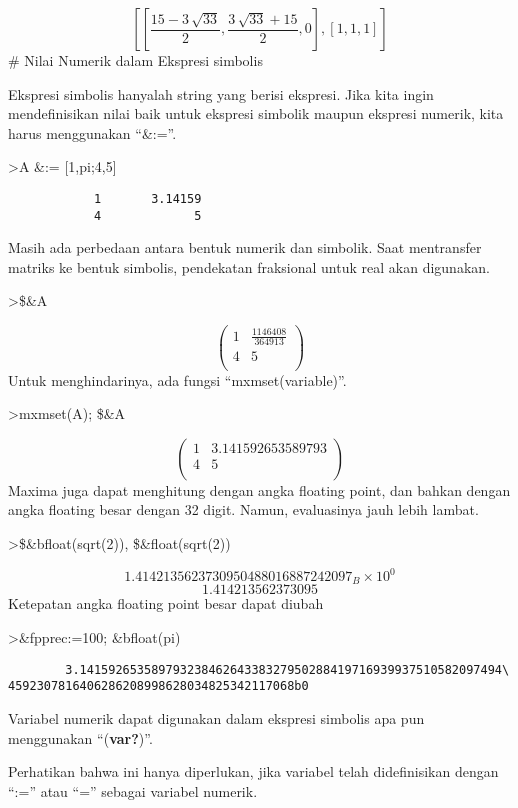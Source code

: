 \documentclass[
]{book}
\begin{document}
\[\left[ \left[ \frac{15-3\,\sqrt{33}}{2} , \frac{3\,\sqrt{33}+15}{2}
  , 0 \right]  , \left[ 1 , 1 , 1 \right]  \right] \]\# Nilai Numerik dalam Ekspresi simbolis

Ekspresi simbolis hanyalah string yang berisi ekspresi. Jika kita ingin mendefinisikan nilai baik untuk ekspresi simbolik maupun ekspresi numerik, kita harus menggunakan ``\&:=''.

\textgreater A \&:= {[}1,pi;4,5{]}

\begin{verbatim}
            1       3.14159 
            4             5 
\end{verbatim}

Masih ada perbedaan antara bentuk numerik dan simbolik. Saat mentransfer matriks ke bentuk simbolis, pendekatan fraksional untuk real akan digunakan.

\textgreater\$\&A

\[\begin{pmatrix}1 & \frac{1146408}{364913} \\ 4 & 5 \\ \end{pmatrix}\]Untuk menghindarinya, ada fungsi ``mxmset(variable)''.

\textgreater mxmset(A); \$\&A

\[\begin{pmatrix}1 & 3.141592653589793 \\ 4 & 5 \\ \end{pmatrix}\]Maxima juga dapat menghitung dengan angka floating point, dan bahkan dengan angka floating besar dengan 32 digit. Namun, evaluasinya jauh lebih lambat.

\textgreater\$\&bfloat(sqrt(2)), \$\&float(sqrt(2))

\[1.4142135623730950488016887242097_B \times 10^{0}\]\[1.414213562373095\]Ketepatan angka floating point besar dapat diubah

\textgreater\&fpprec:=100; \&bfloat(pi)

\begin{verbatim}
        3.14159265358979323846264338327950288419716939937510582097494\
4592307816406286208998628034825342117068b0
\end{verbatim}

Variabel numerik dapat digunakan dalam ekspresi simbolis apa pun menggunakan ``(\textbf{var?})''.

Perhatikan bahwa ini hanya diperlukan, jika variabel telah didefinisikan dengan ``:='' atau ``='' sebagai variabel numerik.
\end{document}

